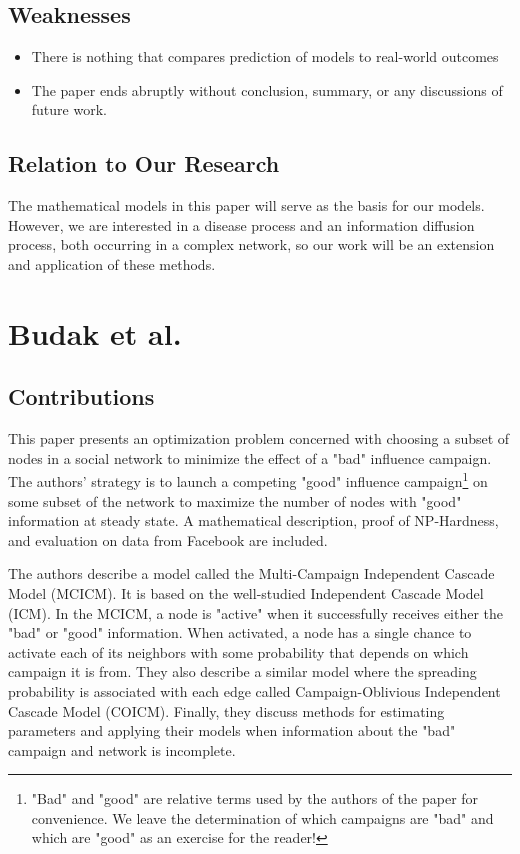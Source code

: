 \documentclass{article}
\begin{document}
    \subsection{Weaknesses}
    \begin{itemize}
        \item There is nothing that compares prediction of models to real-world outcomes
        \item The paper ends abruptly without conclusion, summary, or any discussions of future work. 
    \end{itemize}
    
    \subsection{Relation to Our Research}
    The mathematical models in this paper will serve as the basis for our models. However, we are interested in a disease process and an information diffusion process, both occurring in a complex network, so our work will be an extension and application of these methods. 
    
\section{Budak et al.}
    \subsection{Contributions}
    This paper presents an optimization problem concerned with choosing a subset of nodes in a social network to minimize the effect of a "bad" influence campaign. The authors' strategy is to launch a competing "good" influence campaign\footnote{"Bad" and "good" are relative terms used by the authors of the paper for convenience. We leave the determination of which campaigns are "bad" and which are "good" as an exercise for the reader!} on some subset of the network to maximize the number of nodes with "good" information at steady state. A mathematical description, proof of NP-Hardness, and evaluation on data from Facebook are included.
    
    The authors describe a model called the Multi-Campaign Independent Cascade Model (MCICM). It is based on the well-studied Independent Cascade Model (ICM). In the MCICM, a node is "active" when it successfully receives either the "bad" or "good" information. When activated, a node has a single chance to activate each of its neighbors with some probability that depends on which campaign it is from. They also describe a similar model where the spreading probability is associated with each edge called Campaign-Oblivious Independent Cascade Model (COICM). Finally, they discuss methods for estimating parameters and applying their models when information about the "bad" campaign and network is incomplete.
\end{document}

